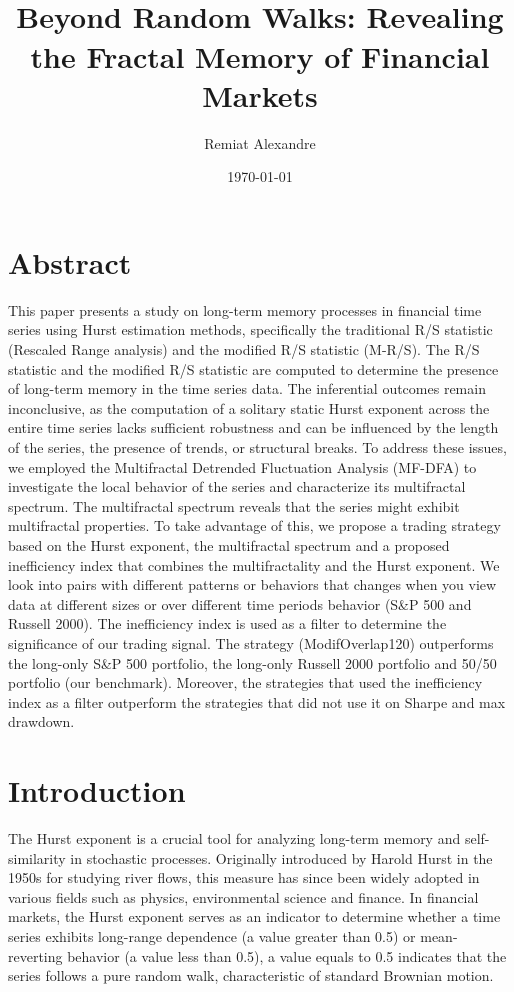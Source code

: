 \documentclass[11pt]{extarticle}
\title{
    \hspace*{-12cm}
    \vspace*{1cm}
    \protect\\
    \vspace*{1cm}
    \textbf{Beyond Random Walks: Revealing the Fractal Memory of Financial Markets}
}
\author{Remiat Alexandre}
\date{\today}
\begin{document}

\maketitle


\newpage


\section*{Abstract}

This paper presents a study on long-term memory processes in financial time series using Hurst estimation methods,
specifically the traditional R/S statistic (Rescaled Range analysis) and the modified R/S statistic (M-R/S).
The R/S statistic and the modified R/S statistic are computed to determine the presence of long-term memory in the time series data.
The inferential outcomes remain inconclusive, as the computation of a solitary static Hurst exponent
across the entire time series lacks sufficient robustness and can be influenced by the length of the series, the presence of trends, or structural breaks.
To address these issues, we employed the Multifractal Detrended Fluctuation Analysis (MF-DFA) to investigate the
local behavior of the series and characterize its multifractal spectrum. The multifractal spectrum reveals that the series
might exhibit multifractal properties. To take advantage of this, we propose a trading strategy based on the Hurst
exponent, the multifractal spectrum and a proposed inefficiency index that combines the multifractality and the Hurst exponent.
We look into pairs with different patterns or behaviors that changes
when you view data at different sizes or over different time periods behavior (S\&P 500 and Russell 2000).
The inefficiency index is used as a filter to determine the significance of our trading signal.
The strategy (ModifOverlap120) outperforms the long-only S\&P 500 portfolio, the long-only Russell 2000 portfolio and
50/50 portfolio (our benchmark). Moreover, the strategies that used the inefficiency index as a filter
outperform the strategies that did not use it on Sharpe and max drawdown.



\newpage

\section{Introduction}

The Hurst exponent is a crucial tool for analyzing long-term memory and self-similarity in stochastic processes.
Originally introduced by Harold Hurst in the 1950s for studying river flows, this measure has since been widely
adopted in various fields such as physics, environmental science and finance. In financial markets, the Hurst
exponent serves as an indicator to determine whether a time series exhibits long-range dependence (a value greater
than 0.5) or mean-reverting behavior (a value less than 0.5), a value equals to 0.5 indicates that the series
follows a pure random walk, characteristic of standard Brownian motion.
\end{document}
